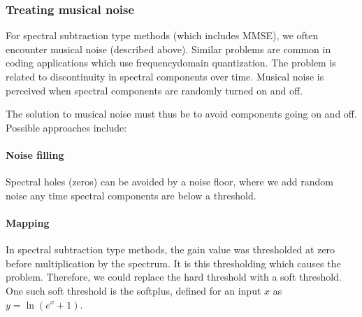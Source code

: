 \documentclass[letterpaper,10pt,english]{jupyterBook}
\begin{document}
\subsubsection{Treating musical noise}
\label{\detokenize{Enhancement/Noise_attenuation:treating-musical-noise}}
\sphinxAtStartPar
For spectral subtraction \sphinxhyphen{}type methods (which includes MMSE), we often encounter musical noise (described above). Similar problems are common in coding applications which use frequency\sphinxhyphen{}domain quantization. The problem is related to discontinuity in spectral components over time. Musical noise is perceived when spectral components are randomly turned on and off.

\sphinxAtStartPar
The solution to musical noise must thus be to avoid components going on and off.
Possible approaches include:


\paragraph{Noise filling}
\label{\detokenize{Enhancement/Noise_attenuation:noise-filling}}
\sphinxAtStartPar
Spectral holes (zeros) can be avoided by a noise floor, where we add random noise any time spectral components are below a threshold.


\paragraph{Mapping}
\label{\detokenize{Enhancement/Noise_attenuation:mapping}}
\sphinxAtStartPar
In spectral subtraction \sphinxhyphen{}type methods, the gain value was thresholded at zero before multiplication by the spectrum. It is this thresholding which causes the problem. Therefore, we could replace the hard threshold with a soft threshold. One such soft threshold is the soft\sphinxhyphen{}plus, defined for an input \(x\) as \(y=\ln\left(e^x+1\right)\).
\end{document}
